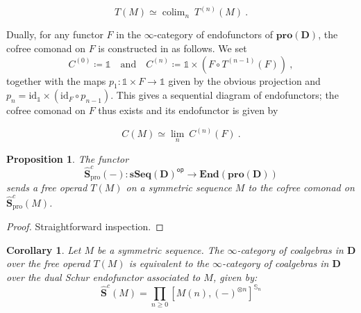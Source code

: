 \documentclass[a4paper,12pt]{amsart}
\DeclareMathOperator*{\colim}{colim}
\theoremstyle{plain}
\newtheorem{proposition}[theorem]{Proposition}%
\newtheorem{corollary}[theorem]{Corollary}%
\theoremstyle{definition}
\theoremstyle{remark}
\begin{document}
\[
T(M) \simeq \colim_n ~ T^{(n)}(M)~. 
\]
\vspace{0.1pc}

Dually, for any functor $F$ in the $\infty$-category of endofunctors of $\mathbf{pro}(\mathbf{D})$, the cofree comonad on $F$ is constructed in \cite[Appendix A.3]{heuts2024} as follows. We set 
\[
C^{(0)} \coloneqq \mathbb{1} \quad \text{and} \quad C^{(n)} \coloneqq \mathbb{1} \times \left(F \circ T^{(n-1)}(F)\right)~,
\]
together with the maps $p_1: \mathbb{1} \times F \longrightarrow \mathbb{1}$ given by the obvious projection and $p_n = \mathrm{id}_{\mathbb{1}} \times (\mathrm{id}_{F} \circ p_{n-1})$. This gives a sequential diagram of endofunctors; the cofree comonad on $F$ thus exists and its endofunctor is given by 

\[
C(M) \simeq \lim_n ~ C^{(n)}(F)~. 
\]

\begin{proposition}\label{prop: sends free operad to cofree monad}
The functor 
\[
\widehat{\mathbf{S}}^c_{\mathrm{pro}}(-): \mathbf{sSeq}(\mathbf{D})^{\mathsf{op}} \longrightarrow \mathbf{End}(\mathbf{pro}(\mathbf{D}))
\]
sends a free operad $T(M)$ on a symmetric sequence $M$ to the cofree comonad on $\widehat{\mathbf{S}}^c_{\mathrm{pro}}(M)$. 
\end{proposition}

\begin{proof}
Straightforward inspection.
\end{proof}

\begin{corollary}\label{corollary: coalgebras over a free infinity operad}
Let $M$ be a symmetric sequence. The $\infty$-category of coalgebras in $\mathbf{D}$ over the free operad $T(M)$ is equivalent to the $\infty$-category of coalgebras in $\mathbf{D}$ over the dual Schur endofunctor associated to $M$, given by: 
\[
\widehat{\mathbf{S}}^c(M) = \prod_{n \geq 0} \left[M(n),(-)^{\otimes n}\right]^{\mathbb{S}_n} 
\]
\end{corollary}
\end{document}

